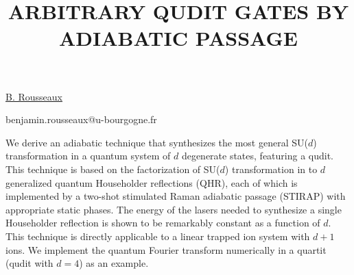 \title{ARBITRARY QUDIT GATES BY ADIABATIC PASSAGE}

\underline{B. Rousseaux} 

{\normalsize{\vspace{-4mm}
\dijon

\email benjamin.rousseaux@u-bourgogne.fr}}

We derive an adiabatic technique that synthesizes the most general SU($d$) transformation in a quantum system of $d$ degenerate states, featuring a qudit.
This technique is based on the factorization of SU($d$) transformation in to $d$ generalized quantum Householder reflections (QHR), each of which is implemented by a two-shot stimulated Raman adiabatic passage (STIRAP) with appropriate static phases. The energy of the lasers needed to synthesize a single Householder reflection is shown to be remarkably constant as a function of $d$. This technique is directly applicable to a linear trapped ion system with $d+1$ ions. We implement the quantum Fourier transform numerically in a quartit (qudit with $d=4$) as an example.

\vspace{\baselineskip}
